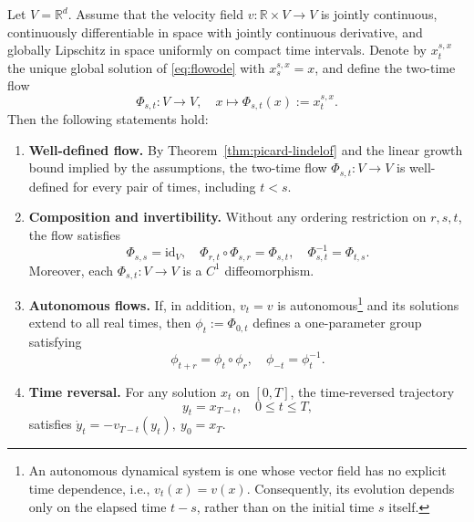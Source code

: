 \documentclass[12pt,a4paper,oneside]{book}
\begin{document}
\begin{theorem}
\label{thm:flow-group}
\label{src:p9q2}

Let $V=\mathbb R^d$. Assume that the velocity field $v:\mathbb R\times V\to V$ is jointly continuous, continuously
differentiable in space with jointly continuous derivative, and globally Lipschitz in space uniformly on compact time intervals.
Denote by $x_t^{s,x}$ the unique global solution of \eqref{eq:flowode} with $x_s^{s,x}=x$, and define the two-time flow
\begin{equation*}
    \Phi_{s,t}:V\to V,\quad
    x\mapsto\Phi_{s,t}(x):=x_t^{s,x}.
\end{equation*}
Then the following statements hold:

\begin{enumerate}
    \item \textbf{Well-defined flow.} By Theorem~\ref{thm:picard-lindelof} and the linear growth bound implied by the
        assumptions, the two-time flow $\Phi_{s,t}:V\to V$ is well-defined for every pair of times, including $t<s$.

    \item \textbf{Composition and invertibility.} Without any ordering restriction on $r,s,t$, the flow
        satisfies
        \begin{equation*}
            \Phi_{s,s}=\mathrm{id}_V,\quad
            \Phi_{r,t}\circ\Phi_{s,r}=\Phi_{s,t},\quad
            \Phi_{s,t}^{-1}=\Phi_{t,s}.
        \end{equation*}
        Moreover, each $\Phi_{s,t}:V\to V$ is a $C^1$ diffeomorphism.

    \item \textbf{Autonomous flows.} If, in addition, $v_t=v$ is autonomous\footnote{An autonomous dynamical system is one
        whose vector field has no explicit time dependence, i.e., $v_t(x)=v(x)$. Consequently, its evolution depends only
        on the elapsed time $t-s$, rather than on the initial time $s$ itself.} and its solutions extend to all real times,
        then $\phi_t:=\Phi_{0,t}$ defines a one-parameter group satisfying
        \begin{equation*}
            \phi_{t+r}=\phi_t\circ\phi_r, \quad \phi_{-t}=\phi_t^{-1}.
        \end{equation*}

    \item \textbf{Time reversal.} For any solution $x_t$ on $[0,T]$, the time-reversed trajectory
        \begin{equation*}
            y_t=x_{T-t}, \quad 0\le t\le T,
        \end{equation*}
        satisfies $\dot y_t=-v_{T-t}(y_t),\ y_0=x_T$.
\end{enumerate}
\end{theorem}
\end{document}
